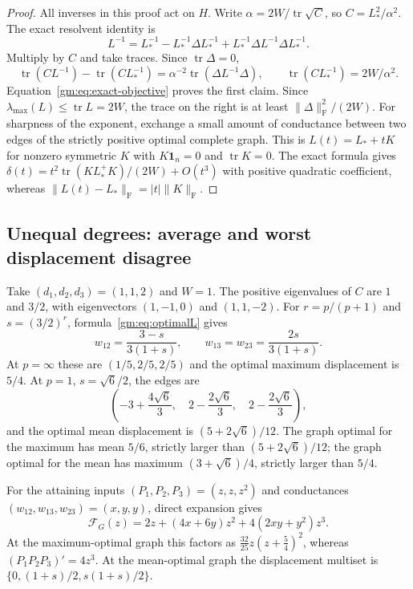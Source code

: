 \begin{proof}
All inverses in this proof act on $H$. Write
$\alpha=2W/\operatorname{tr}\sqrt C$, so $C=L_*^2/\alpha^2$.
The exact resolvent identity is
\[
 L^{-1}=L_*^{-1}-L_*^{-1}\Delta L_*^{-1}
       +L_*^{-1}\Delta L^{-1}\Delta L_*^{-1}.
\]
Multiply by $C$ and take traces. Since $\operatorname{tr}\Delta=0$,
\[
 \operatorname{tr}(CL^{-1})-\operatorname{tr}(CL_*^{-1})
 =\alpha^{-2}\operatorname{tr}(\Delta L^{-1}\Delta),\qquad
 \operatorname{tr}(CL_*^{-1})=2W/\alpha^2.
\]
Equation~\eqref{gm:eq:exact-objective} proves the first claim.
Since $\lambda_{\max}(L)\le\operatorname{tr}L=2W$, the trace on the
right is at least $\|\Delta\|_{\mathrm F}^2/(2W)$.
For sharpness of the exponent, exchange a small amount of conductance
between two edges of the strictly positive optimal complete graph. This is
$L(t)=L_*+tK$ for nonzero symmetric $K$ with $K\mathbf1_n=0$
and $\operatorname{tr}K=0$. The exact formula gives
$\delta(t)=t^2\operatorname{tr}(K L_*^+K)/(2W)+O(t^3)$ with positive
quadratic coefficient, whereas $\|L(t)-L_*\|_{\mathrm F}=|t|\|K\|_{\mathrm F}$.
\end{proof}

\subsection{Unequal degrees: average and worst displacement disagree}

Take $(d_1,d_2,d_3)=(1,1,2)$ and $W=1$. The positive eigenvalues of $C$
are $1$ and $3/2$, with eigenvectors $(1,-1,0)$ and $(1,1,-2)$.
For $r=p/(p+1)$ and $s=(3/2)^r$, formula~\eqref{gm:eq:optimalL} gives
\[
 w_{12}=\frac{3-s}{3(1+s)},\qquad
 w_{13}=w_{23}=\frac{2s}{3(1+s)}.
\]
At $p=\infty$ these are $(1/5,2/5,2/5)$ and the optimal maximum
displacement is $5/4$. At $p=1$, $s=\sqrt6/2$, the edges are
\[
 \left(-3+\frac{4\sqrt6}3,\quad
 2-\frac{2\sqrt6}3,\quad 2-\frac{2\sqrt6}3\right),
\]
and the optimal mean displacement is $(5+2\sqrt6)/12$.
The graph optimal for the maximum has mean $5/6$, strictly larger than
$(5+2\sqrt6)/12$; the graph optimal for the mean has maximum
$(3+\sqrt6)/4$, strictly larger than $5/4$.

For the attaining inputs $(P_1,P_2,P_3)=(z,z,z^2)$ and conductances
$(w_{12},w_{13},w_{23})=(x,y,y)$, direct expansion gives
\[
 \mathcal F_G(z)=2z+(4x+6y)z^2+4(2xy+y^2)z^3.
\]
At the maximum-optimal graph this factors as
$\frac{32}{25}z(z+\frac54)^2$, whereas $(P_1P_2P_3)'=4z^3$.
At the mean-optimal graph the displacement multiset is
$\{0,(1+s)/2,s(1+s)/2\}$.

